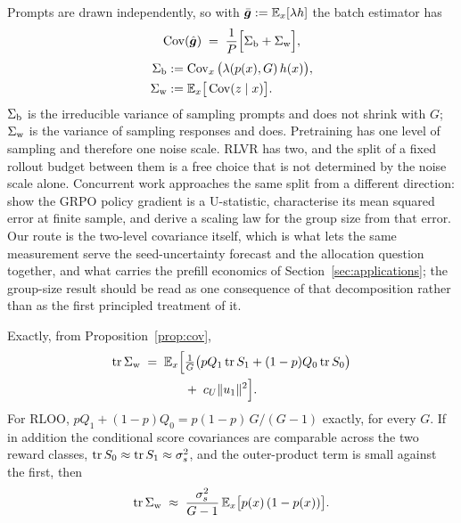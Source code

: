 Prompts are drawn independently, so with $\bar{\bm{g}} := \mathbb{E}_x[\lambda h]$ the batch estimator has
\begin{equation}
  \label{eq:hierarchy}
  \operatorname{Cov}(\hat{\bm{g}}) \;=\; \frac{1}{P}\Big[ \Sigma_{\mathrm{b}} + \Sigma_{\mathrm{w}} \Big],
\end{equation}
\begin{align}
  \Sigma_{\mathrm{b}} &:= \operatorname{Cov}_x\big( \lambda(p(x), G)\, h(x) \big), \notag \\
  \Sigma_{\mathrm{w}} &:= \mathbb{E}_x\big[ \operatorname{Cov}(z \mid x) \big]. \notag
\end{align}
$\Sigma_{\mathrm{b}}$ is the irreducible variance of sampling prompts and does not shrink with $G$; $\Sigma_{\mathrm{w}}$ is the
variance of sampling responses and does. Pretraining has one level of sampling and therefore one
noise scale. RLVR has two, and the split of a fixed rollout budget between them is a free choice
that is not determined by the noise scale alone. Concurrent work approaches the same split from a
different direction: \citet{zhou2026ustatistic} show the GRPO policy gradient is a U-statistic,
characterise its mean squared error at finite sample, and derive a scaling law for the group size
from that error. Our route is the two-level covariance itself, which is what lets the same
measurement serve the seed-uncertainty forecast and the allocation question together, and what
carries the prefill economics of Section~\ref{sec:applications}; the group-size result should be
read as one consequence of that decomposition rather than as the first principled treatment of
it.

\begin{corollary}
  \label{cor:bernoulli}
  Exactly, from Proposition~\ref{prop:cov},
  \begin{equation}
    \label{eq:sw-exact}
    \begin{aligned}
      \operatorname{tr} \Sigma_{\mathrm{w}} \;=\; \mathbb{E}_x\Big[
        &\tfrac{1}{G}\big( p Q_1 \operatorname{tr} S_1 + (1-p) Q_0 \operatorname{tr} S_0 \big) \\
        &+\; c_U \|u_1\|^2 \Big].
    \end{aligned}
  \end{equation}
  For RLOO, $p Q_1 + (1-p) Q_0 = p(1-p)\,G/(G-1)$ exactly, for every $G$. If in addition the
  conditional score covariances are comparable across the two reward classes,
  $\operatorname{tr} S_0 \approx \operatorname{tr} S_1 \approx \sigma_s^2$, and the outer-product term is small against the
  first, then
  \begin{equation}
    \label{eq:bernoulli}
    \operatorname{tr} \Sigma_{\mathrm{w}} \;\approx\; \frac{\sigma_s^2}{G-1}\, \mathbb{E}_x\big[ p(x)\,(1 - p(x)) \big].
  \end{equation}
\end{corollary}

